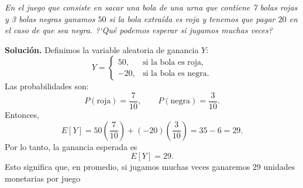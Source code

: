 \documentclass[11pt]{article}
\begin{document}
\begin{tcolorbox}[title = \textcolor{black}{\textcolor{white}{Problema 8}}]
\textit{En el juego que consiste en sacar una bola de una urna que contiene 7 bolas rojas y 3 bolas negras ganamos $50$ si la bola
extra\'ida es roja y tenemos que pagar $20$ en el caso de que sea negra. ?`Qu\'e podemos esperar si jugamos muchas veces? 
}
\end{tcolorbox}
\textbf{Solución.} Definimos la variable aleatoria de ganancia $Y$:
\[
Y=\begin{cases}
50, & \text{si la bola es roja},\\
-20, & \text{si la bola es negra}.
\end{cases}
\]
Las probabilidades son:
\[
P(\text{roja})=\frac{7}{10}, \qquad P(\text{negra})=\frac{3}{10}.
\]
Entonces,
\[
E[Y]=50\left(\frac{7}{10}\right) + (-20)\left(\frac{3}{10}\right)
     = 35 - 6 = 29.
\]
Por lo tanto, la ganancia esperada es
\[
\boxed{E[Y]=29}.
\]
Esto significa que, en promedio, si jugamos muchas veces ganaremos 29 unidades monetarias por juego
\end{document}
